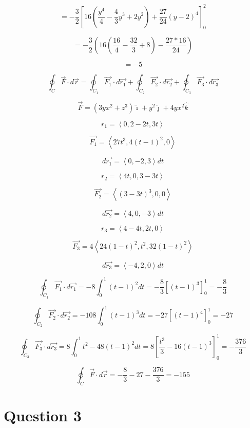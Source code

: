\documentclass[12pt]{article}
\begin{document}
\[
    = - \frac{3}{2} {\left[16 \left(\frac{y^4}{4}-\frac{4}{3}y^3+2y^2\right) + \frac{27}{24} {\left(y - 2\right)}^4\right] }_0^2
\]

\[
    = - \frac{3}{2} \left(16 \left(\frac{16}{4}-\frac{32}{3}+8\right) - \frac{27*16}{24}\right)
\]

\[
    = - 5
\]

\[
    \oint_C \vec{F} \cdot d \vec{r}
    = \oint_{C_1} \overrightarrow{F_1} \cdot d \vec{r_1}
    + \oint_{C_2} \overrightarrow{F_2} \cdot d \vec{r_2}
    + \oint_{C_3} \overrightarrow{F_3} \cdot d \vec{r_3}
\]

\[
    \vec{F}=\left(3 y x^2+z^3\right) \hat{\imath}+y^2 \hat{\jmath}+4 y x^2 \hat{k}
\]

\[
    r_1 = \left\langle0, 2-2t, 3t\right\rangle
\]

\[
    \overrightarrow{F_1} =
    \left\langle 27 t^3, 4{(t-1)}^2, 0\right\rangle
\]

\[
    d \vec{r_1} = \left\langle0, -2, 3\right\rangle dt
\]

\[
    r_2 = \left\langle4t, 0, 3-3t\right\rangle
\]

\[
    \overrightarrow{F_2} =
    \left\langle {(3-3t)}^3, 0, 0\right\rangle
\]

\[
    d \vec{r_2} = \left\langle4, 0, -3\right\rangle dt
\]

\[
    r_3 = \left\langle4-4t, 2t, 0\right\rangle
\]

\[
    \overrightarrow{F_3} =
    4\left\langle 24{(1-t)}^2, t^2, 32{(1-t)}^2\right\rangle
\]

\[
    d \vec{r_3} = \left\langle-4, 2, 0\right\rangle dt
\]

\[
    \oint_{C_1} \overrightarrow{F_1} \cdot d \vec{r_1}
    = - 8 \int_0^1 {(t-1)}^2 dt
    = - \frac{8}{3} {\left[ {(t-1)}^3 \right]}_0^1
    = - \frac{8}{3}
\]

\[
    \oint_{C_2} \overrightarrow{F_2} \cdot d \vec{r_2}
    = - 108 \int_0^1 {(t-1)}^3 dt
    = - 27 {\left[ {(t-1)}^4 \right]}_0^1
    = - 27
\]

\[
    \oint_{C_3} \overrightarrow{F_3} \cdot d \vec{r_3}
    = 8 \int_0^1 t^2 - 48 {(t-1)}^2 dt
    = 8 {\left[ \frac{t^3}{3} - 16 {(t-1)}^3 \right]}_0^1
    = -\frac{376}{3}
\]

\[
    \oint_C \vec{F} \cdot d \vec{r}
    = - \frac{8}{3} - 27 - \frac{376}{3}
    = - 155
\]


\newpage
\section{Question 3}
\end{document}
